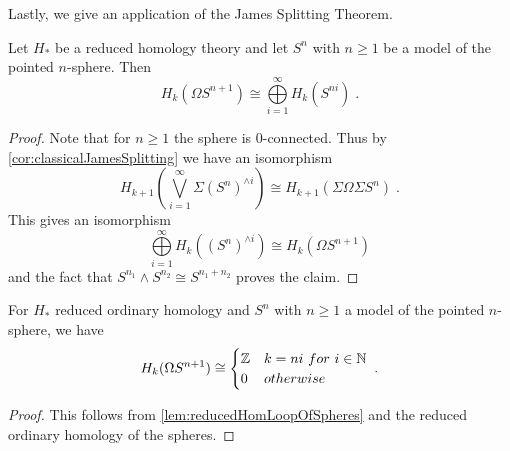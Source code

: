 Lastly, we give an application of the James Splitting Theorem.
\begin{lemma}\label{lem:reducedHomLoopOfSpheres}
    Let $H_*$ be a reduced homology theory and let $S^n$ with $n\geq1$ be a model of the pointed $n$-sphere.
    Then
    \begin{equation*}
        H_k(\Omega S^{n+1})\cong\bigoplus\limits_{i=1}^{\infty}H_k(S^{ni})\;.
    \end{equation*}
    \begin{proof}
        Note that for $n\geq1$ the sphere is $0$-connected.
        Thus by \cref{cor:classicalJamesSplitting} we have an isomorphism 
        \begin{equation*}
            H_{k+1}\left(\bigvee\limits_{i=1}^{\infty}\Sigma \left(S^n\right)^{\wedge i}\right)\cong H_{k+1}\left(\Sigma\Omega\Sigma S^n\right)\;.
        \end{equation*}
        This gives an isomorphism
        \begin{equation*}
            \bigoplus\limits_{i=1}^{\infty}H_k\left(\left(S^n\right)^{\wedge i}\right)\cong H_k\left(\Omega S^{n+1}\right)
        \end{equation*}
        and the fact that $S^{n_1}\wedge S^{n_2}\cong S^{n_1+n_2}$ proves the claim.
    \end{proof}
\end{lemma}
\begin{corollary}
    For $H_*$ reduced ordinary homology and $S^n$ with $n\geq1$ a model of the pointed $n$-sphere, we have
    \begin{equation*}
        H_k(\Omega S^{n+1})\cong
        \begin{cases}
            \mathbb{Z} & k=ni ~for~ i\in\mathbb{N}\\
            0 & otherwise
        \end{cases}\;.
    \end{equation*}
    \begin{proof}
        This follows from \cref{lem:reducedHomLoopOfSpheres} and the reduced ordinary homology of the spheres.
    \end{proof}
\end{corollary}
